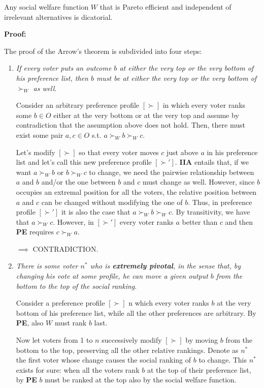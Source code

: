 \documentclass[pt11,a4paper,twoside,reqno,openright]{paper}
\begin{document}
\noindent Any social welfare function $W$ that is Pareto efficient and 
independent of irrelevant alternatives is dicatorial.

\bigskip
\noindent \textbf{Proof:}

\noindent The proof of the Arrow's theorem is subdivided into four steps:
\begin{enumerate}
	\item \textit{If every voter puts an outcome $b$ at either the very top or 
	the very bottom of his preference list, then $b$ must be at either the very 
	top or the very bottom of $\succ_W$ as well}.

	\noindent Consider an arbitrary preference profile $[\succ]$ in which every 
	voter ranks some $b \in O$ either at the very bottom or at the very top and 
	assume by contradiction that the assumption above does not hold. Then, there 
	must exist some pair $a,c \in O$ s.t. $a \succ_W b \succ_W c$.

	\noindent Let's modify $[\succ]$ so that every voter moves $c$ just above 
	$a$ in his preference list and let's call this new preference profile 
	$[\succ']$. \textbf{IIA} entails that, if we want $a \succ_W b$ or $b 
	\succ_W c$ to change, we need the pairwise relationship between $a$ and $b$ 
	and/or the one between $b$ and $c$ must change as well. However, since $b$ 
	occupies an extremal position for all the voters, the relative position 
	between $a$ and $c$ can be changed without modifying the one of $b$. Thus, 
	in preference profile $[\succ']$ it is also the case that $a \succ_W b 
	\succ_W c$. By transitivity, we have that $a \succ_W c$. However, in 
	$[\succ']$ every voter ranks $a$ better than $c$ and then \textbf{PE} 
	requires $c \succ_W a$.

	\noindent $\implies$ CONTRADICTION.

	\item \textit{There is some voter $n^*$ who is \textbf{extremely pivotal}, 
	in the sense that, by changing his vote at some profile, he can move a 
	given output $b$ from the bottom to the top of the social ranking}.

	\noindent Consider a preference profile $[\succ]$ n which every voter ranks 
	$b$ at the very bottom of his preference list, while all the other 
	preferences are arbitrary. By \textbf{PE}, also $W$ must rank $b$ last.

	\noindent Now let voters from 1 to $n$ successively modify $[\succ]$ by 
	moving $b$ from the bottom to the top, preserving all the other relative 
	rankings. Denote as $n^*$ the first voter whose change causes the social 
	ranking of $b$ to change. This $n^*$ exists for sure: when all the voters 
	rank $b$ at the top of their preference list, by \textbf{PE} $b$ must be 
	ranked at the top also by the social welfare function.


\end{enumerate}
\end{document}
